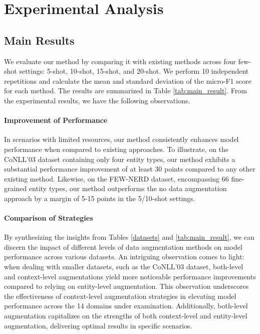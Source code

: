 \documentclass[11pt]{article}
\begin{document}
\section{Experimental Analysis}

\subsection{Main Results}
We evaluate our method by comparing it with existing methods across four few-shot settings: 5-shot, 10-shot, 15-shot, and 20-shot. We perform 10 independent repetitions and calculate the mean and standard deviation of the micro-F1 score for each method. The results are summarized in Table \ref{tab:main_result}.
From the experimental results, we have the following observations.

\paragraph{Improvement of Performance}
In scenarios with limited resources, our method consistently enhances model performance when compared to existing approaches. To illustrate, on the CoNLL'03 dataset containing only four entity types, our method exhibits a substantial performance improvement of at least 30 points compared to any other existing method. Likewise, on the FEW-NERD dataset, encompassing 66 fine-grained entity types, our method outperforms the no data augmentation approach by a margin of 5-15 points in the 5/10-shot settings.

\paragraph{Comparison of Strategies}
By synthesizing the insights from Tables \ref{datasets} and \ref{tab:main_result}, we can discern the impact of different levels of data augmentation methods on model performance across various datasets. An intriguing observation comes to light: when dealing with smaller datasets, such as the CoNLL'03 dataset, both-level and context-level augmentations yield more noticeable performance improvements compared to relying on entity-level augmentation.
This observation underscores the effectiveness of context-level augmentation strategies in elevating model performance across the 14 domains under examination. Additionally, both-level augmentation capitalizes on the strengths of both context-level and entity-level augmentation, delivering optimal results in specific scenarios.
\end{document}
